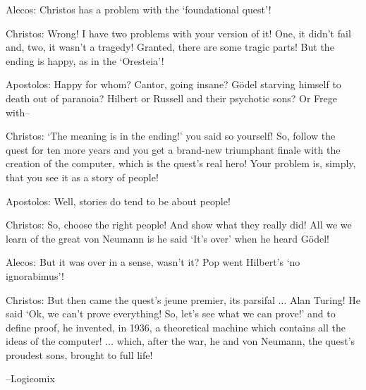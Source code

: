\newpage

{

\narrower\parindent=0pt
\baselineskip

{\it

Alecos: Christos has a problem with the `foundational quest'!

Christos:  Wrong!  I have two problems with your  {\rm {version}} of it!  One, it
didn't fail and, two, it wasn't a tragedy!  Granted, there are some tragic
parts!  But the ending is happy, as in the `Oresteia'!  

Apostolos:  Happy for whom?  Cantor, going insane?  G\"odel starving himself to
death out of paranoia? Hilbert or Russell and their psychotic sons? Or Frege with--

Christos: `The meaning
is in the ending!' you said so yourself!  So, follow the quest for ten more years and
you get a brand-new triumphant finale with the creation of the computer, which is the
quest's real hero!   Your problem is, simply, that you see it as a story of people!

Apostolos: Well, stories do tend to be about people!

Christos:  So, choose the right people!  And show what they really did!  All we we learn
of the great von Neumann is he said `It's over'  when he heard G\"odel!

Alecos: But it was over in a sense, wasn't it?  Pop went Hilbert's `no ignorabimus'!

Christos:  But then came the quest's jeune premier, its parsifal $\ldots$ Alan Turing!
He said `Ok, we can't prove everything! So, let's see what we can prove!' and to define
proof, he invented, in 1936, a theoretical machine which contains all the ideas of the
computer! $\ldots$ which, after the war, he and von Neumann, the quest's proudest sons,
brought to full life!

{\hfill--Logicomix} %

}

}

\newpage

